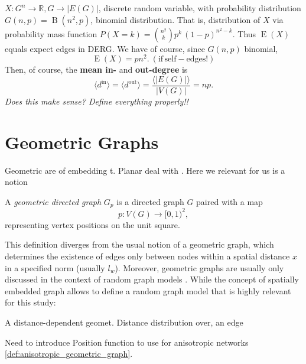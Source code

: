 \begin{remark}
  $X: G^n \to \mathbb{R}, G \to |E(G)|$, discrete random variable,
  with probability distribution $G(n,p) =\operatorname{B}(n^2,p)$,
  binomial distribution. That is, distribution of $X$ via probability
  mass function $P(X=k) = {{n^2} \choose k} p^k\,(1-p)^{n^2-k}$. Thus
  $\operatorname{E}(X)$ equals expect edges in DERG. We have of
  course, since $G(n,p)$ binomial,
  \[
  \operatorname{E}(X) = pn^2. \mathrm{\:(if\,self-edges!)}
  \]
  Then, of course, the \textbf{mean in-}  and \textbf{out-degree} is \[ \langle
  d^{\mathrm{in}} \rangle = \langle d^{\mathrm{out}} \rangle =
  \frac{\langle |E(G)| \rangle}{|V(G)|} = np.\] \textit{Does this make
    sense? Define everything properly!!}
\end{remark}




\section{Geometric Graphs}

Geometric are of embedding t. Planar deal with . Here we relevant for
us is a notion

\begin{definition} A \textit{geometric
    directed graph} $G_p$ is a directed graph $G$ paired with a map
\[
  p:V(G) \to [0,1)^2,
\]
representing vertex positions on the unit square.
\end{definition}

\begin{remark} This definition diverges from the usual notion of a
  geometric graph, which determines the existence of edges only
  between nodes within a spatial distance $x$ in a specified norm
  (usually $l_w$). Moreover, geometric graphs are usually only
  discussed in the context of random graph
  models \parencite{Gilbert1961}.  While the concept of spatially
  embedded graph allows to define a random graph model that is highly
  relevant for this study:
\end{remark}

\begin{definition}
A distance-dependent geomet. Distance distribution over, an edge 
\end{definition}


Need to introduce Position function to use for anisotropic networks
\ref{def:anisotropic_geometric_graph}.






